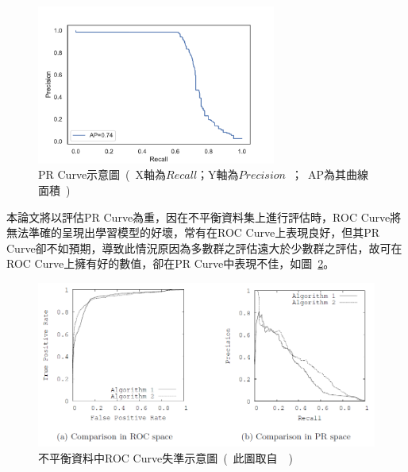 \begin{figure}[!htb]
    \begin{center}
      \includegraphics[width=0.7\textwidth]{figures/evaluation/Image_PRCurve.pdf}
      \caption[PR Curve示意圖]{PR Curve示意圖\ (\ X軸為$Recall$；Y軸為$Precision$\ ；\ AP為其曲線面積\ )}
      \label{fig:eva_PRCurve}
    \end{center}
\end{figure}
\newpage

本論文將以評估PR Curve為重，因在不平衡資料集上進行評估時，ROC Curve將無法準確的呈現出學習模型的好壞，常有在ROC Curve上表現良好，但其PR Curve卻不如預期，導致此情況原因為多數群之評估遠大於少數群之評估，故可在ROC Curve上擁有好的數值，卻在PR Curve中表現不佳\cite{davis2006relationship}，如圖~\ref{fig:eva_GoodROCBadPR}。

\begin{figure}[!htb]
    \begin{center}
      \includegraphics[width=1\textwidth]{figures/evaluation/Image_GoodROCBadPR.png}
      \caption[不平衡資料中ROC Curve失準示意圖]{不平衡資料中ROC Curve失準示意圖\ (\ 此圖取自~\cite{davis2006relationship}\ )}
      \label{fig:eva_GoodROCBadPR}
    \end{center}
\end{figure}
\newpage

